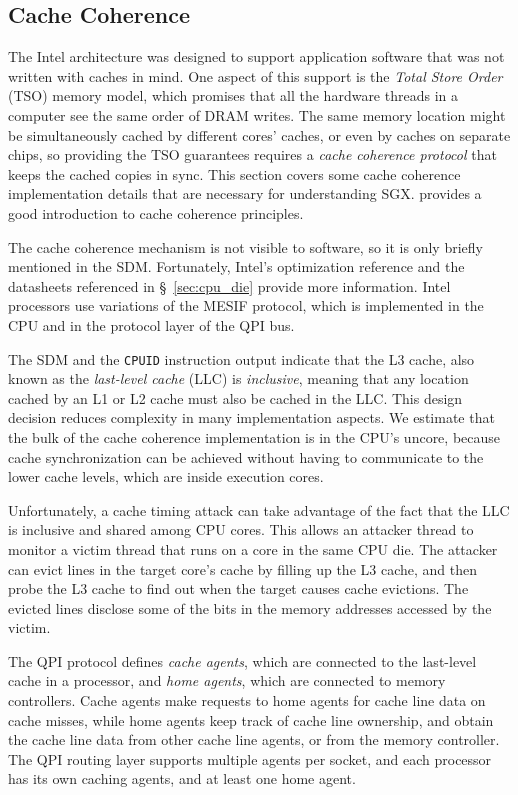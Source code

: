 \subsection{Cache Coherence}
\label{sec:cache_coherence}

The Intel architecture was designed to support application software that was
not written with caches in mind. One aspect of this support is the
\textit{Total Store Order} (TSO) \cite{owens2009tso} memory model, which
promises that all the hardware threads in a computer see the same order of DRAM
writes. The same memory location might be simultaneously cached by different
cores' caches, or even by caches on separate chips, so providing the TSO
guarantees requires a \textit{cache coherence protocol} that keeps the cached
copies in sync. This section covers some cache coherence implementation details
that are necessary for understanding SGX. \cite{hennessy2012architecture}
provides a good introduction to cache coherence principles.

The cache coherence mechanism is not visible to software, so it is only briefly
mentioned in the SDM. Fortunately, Intel's optimization reference
\cite{intel2014optimization} and the datasheets referenced in
\S~\ref{sec:cpu_die} provide more information. Intel processors use variations
of the MESIF \cite{goodman2009mesif} protocol, which is implemented in the CPU
and in the protocol layer of the QPI bus.

The SDM and the \texttt{CPUID} instruction output indicate that the L3 cache,
also known as the \textit{last-level cache} (LLC) is \textit{inclusive},
meaning that any location cached by an L1 or L2 cache must also be cached in
the LLC. This design decision reduces complexity in many implementation
aspects. We estimate that the bulk of the cache coherence implementation is in
the CPU's uncore, because cache synchronization can be achieved without having
to communicate to the lower cache levels, which are inside execution cores.

Unfortunately, a cache timing attack can take advantage of the fact that the
LLC is inclusive and shared among CPU cores. This allows an attacker thread
to monitor a victim thread that runs on a core in the same CPU die. The
attacker can evict lines in the target core's cache by filling up the L3 cache,
and then probe the L3 cache to find out when the target causes cache evictions.
The evicted lines disclose some of the bits in the memory addresses accessed by
the victim.

The QPI protocol defines \textit{cache agents}, which are connected to the
last-level cache in a processor, and \textit{home agents}, which are connected
to memory controllers. Cache agents make requests to home agents for cache line
data on cache misses, while home agents keep track of cache line ownership, and
obtain the cache line data from other cache line agents, or from the memory
controller. The QPI routing layer supports multiple agents per socket, and each
processor has its own caching agents, and at least one home agent.


